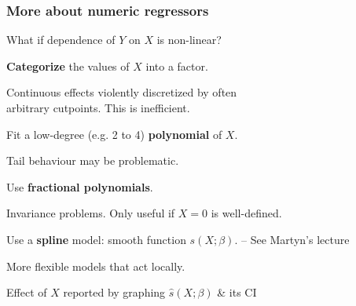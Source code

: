 \documentclass[12pt,dvipsnames,t,handout%
,aspectratio=169%
]{beamer}
\begin{document}
\begin{frame}[fragile]\frametitle{More about numeric regressors}

What if dependence of $Y$ on $X$ is non-linear?

\begin{itemize}
\item {\bf Categorize} the values of $X$ into a factor.

\bi
{\normalsize
\item[--] Continuous effects violently discretized 
  by often \\ arbitrary cutpoints. This is inefficient.
}
\ei
\medskip
\item Fit a low-degree (e.g. 2 to 4) {\bf polynomial} of $X$.
\bi
{\normalsize
\item[--] Tail behaviour may be problematic. 
}
\ei
 \medskip
\item Use {\bf fractional polynomials}.
\bi
{\normalsize
\item[--] Invariance problems. Only useful if $X = 0$ is well-defined.
}
\ei
\medskip
\item Use a {\bf spline} model: smooth function $s(X;\beta)$. -- See Martyn's lecture
\bi
{\normalsize
\item[--] More flexible models that act locally.
\item[--] Effect of $X$ reported by graphing $\widehat s(X;\beta)$ \& its CI
}
\ei
\end{itemize}
 
\end{frame}
\end{document}
